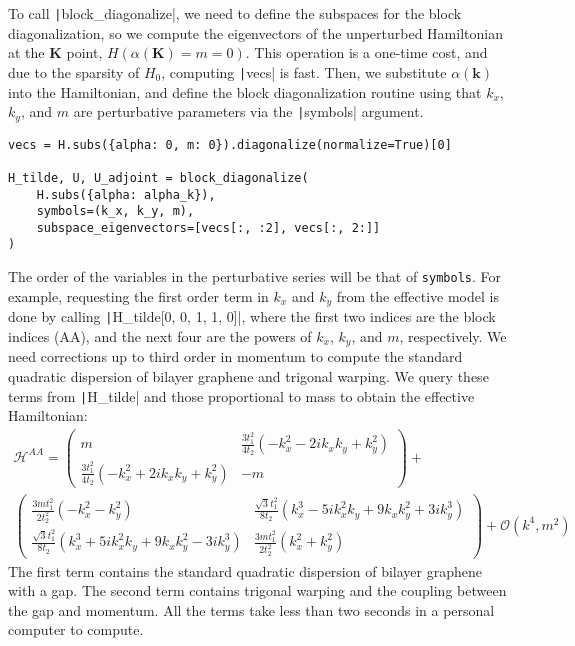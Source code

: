To call \texttt|block_diagonalize|, we need to define the subspaces
for the block diagonalization, so we compute the eigenvectors of the
unperturbed Hamiltonian at the $\mathbf{K}$ point, $H(\alpha(\mathbf{K}) = m =
0)$.
This operation is a one-time cost, and due to the sparsity of $H_0$, computing
\texttt|vecs| is fast.
Then, we substitute $\alpha(\mathbf{k})$ into the Hamiltonian, and define the
block diagonalization routine using that $k_x$, $k_y$, and $m$ are perturbative
parameters via the \texttt|symbols| argument.
%
\begin{verbatim}
vecs = H.subs({alpha: 0, m: 0}).diagonalize(normalize=True)[0]

H_tilde, U, U_adjoint = block_diagonalize(
    H.subs({alpha: alpha_k}),
    symbols=(k_x, k_y, m),
    subspace_eigenvectors=[vecs[:, :2], vecs[:, 2:]]
)
\end{verbatim}
%
The order of the variables in the perturbative series will be that of
\texttt{symbols}.
For example, requesting the first order term in $k_x$ and $k_y$ from the
effective model is done by calling \texttt|H_tilde[0, 0, 1, 1, 0]|,
where the first two indices are the block indices (AA), and the next four are
the powers of $k_x$, $k_y$, and $m$, respectively.
We need corrections up to third order in momentum to compute the standard
quadratic dispersion of bilayer graphene and trigonal warping.
We query these terms from \texttt|H_tilde| and those proportional
to mass to obtain the effective Hamiltonian:
%
{\small
\begin{gather}
\mathcal{H}^{AA} =
\begin{pmatrix}
m & \frac{3 t_1^2}{4 t_2} ( - k_x^2 - 2ik_x k_y + k_y^2) \\
\frac{3 t_1^2}{4 t_2} ( - k_x^2 + 2ik_x k_y + k_y^2) & -m
\end{pmatrix} + \nonumber \\
\begin{pmatrix}
\frac{3 m t_1^2}{2 t_2^2} ( - k_x^2 - k_y^2) & \frac{\sqrt{3} t_1^2}{8 t_2} (k_x^3 - 5ik_x^2 k_y + 9 k_x k_y^2 + 3ik_y^3) \\
\frac{\sqrt{3} t_1^2}{8 t_2} (k_x^3 + 5ik_x^2 k_y + 9 k_x k_y^2 - 3ik_y^3) & \frac{3 m t_1^2}{2 t_2^2} (k_x^2 + k_y^2)
\end{pmatrix} \nonumber
+
\mathcal{O}(k^4, m^2)
\end{gather}
}
%
The first term contains the standard quadratic dispersion of bilayer graphene
with a gap.
The second term contains trigonal warping and the coupling between the gap and
momentum.
All the terms take less than two seconds in a personal computer to compute.

